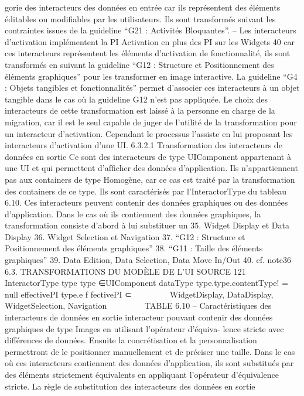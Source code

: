 \documentclass{article}
\begin{document}
gorie des interacteurs des données en entrée car ils représentent des éléments éditables ou
modiﬁables par les utilisateurs. Ils sont transformés suivant les contraintes issues de la guideline
“G21 : Activités Bloquantes”.
– Les interacteurs d’activation implémentent la PI Activation en plus des PI sur les Widgets 40
car ces interacteurs représentent les éléments d’activation de fonctionnalité, ils sont transformés
en suivant la guideline “G12 : Structure et Positionnement des éléments graphiques” pour
les transformer en image interactive. La guideline “G4 : Objets tangibles et fonctionnalités”
permet d’associer ces interacteurs à un objet tangible dans le cas où la guideline G12 n’est
pas appliquée. Le choix des interacteurs de cette transformation est laissé à la personne en
charge de la migration, car il est le seul capable de juger de l’utilité de la transformation pour
un interacteur d’activation. Cependant le processus l’assiste en lui proposant les interacteurs
d’activation d’une UI.
6.3.2.1
Transformation des interacteurs de données en sortie
Ce sont des interacteurs de type UIComponent appartenant à une UI et qui permettent d’afﬁcher
des données d’application. Ils n’appartiennent pas aux containers de type Homogène, car ce cas est
traité par la transformation des containers de ce type. Ils sont caractérisés par l’InteractorType du
tableau 6.10.
Ces interacteurs peuvent contenir des données graphiques ou des données d’application. Dans le
cas où ils contiennent des données graphiques, la transformation consiste d’abord à lui substituer un
35. Widget Display et Data Display
36. Widget Selection et Navigation
37. “G12 : Structure et Positionnement des éléments graphiques”
38. “G11 : Taille des éléments graphiques”
39. Data Edition, Data Selection, Data Move In/Out
40. cf. note36
6.3. TRANSFORMATIONS DU MODÈLE DE L’UI SOURCE
121
InteractorType
type
type ∈{UIComponent}
dataType
type.type.contentType! = null
effectivePI
type.e f fectivePI ⊂







WidgetDisplay,
DataDisplay,
WidgetSelection,
Navigation







TABLE 6.10 – Caractéristiques des interacteurs de données en sortie
interacteur pouvant contenir des données graphiques de type Images en utilisant l’opérateur d’équiva-
lence stricte avec différences de données. Ensuite la concrétisation et la personnalisation permettront
de le positionner manuellement et de préciser une taille.
Dans le cas où ces interacteurs contiennent des données d’application, ils sont substitués par des
éléments strictement équivalents en appliquant l’opérateur d’équivalence stricte.
La règle de substitution des interacteurs des données en sortie
\end{document}
